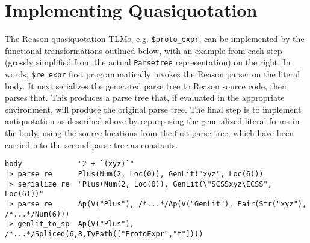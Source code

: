 \documentclass[12pt]{report}
\newcommand{\li}[1]{\lstinline[basicstyle=\ttfamily\fontsize{10pt}{1em}\selectfont]{#1}}
\begin{document}
\chapter{Implementing Quasiquotation} The Reason quasiquotation TLMs, e.g. \li{$proto_expr}, can be implemented by the functional transformations outlined below, with an example from each step (grossly simplified from the actual \li{Parsetree} representation) on the right. In words, \li{$re_expr} first programmatically invokes the Reason parser on the literal body. It next serializes the generated parse tree to Reason source code, then parses that. This produces a parse tree that, if evaluated in the appropriate environment, will produce the original parse tree. The final step is to implement antiquotation as described above by repurposing the generalized literal forms in the body, using the source locations from the first parse tree, which have  been carried into the second parse tree as constants.
\begin{lstlisting}[numbers=none,basicstyle=\ttfamily\fontsize{8.4pt}{1em}\selectfont]
body             "2 + `(xyz)`" 
|> parse_re      Plus(Num(2, Loc(0)), GenLit("xyz", Loc(6)))
|> serialize_re  "Plus(Num(2, Loc(0)), GenLit(\"SCSSxyz\ECSS", Loc(6)))"
|> parse_re      Ap(V("Plus"), /*...*/Ap(V("GenLit"), Pair(Str("xyz"), /*...*/Num(6)))
|> genlit_to_sp  Ap(V("Plus"), /*...*/Spliced(6,8,TyPath(["ProtoExpr","t"])))
\end{lstlisting}



\end{document}
